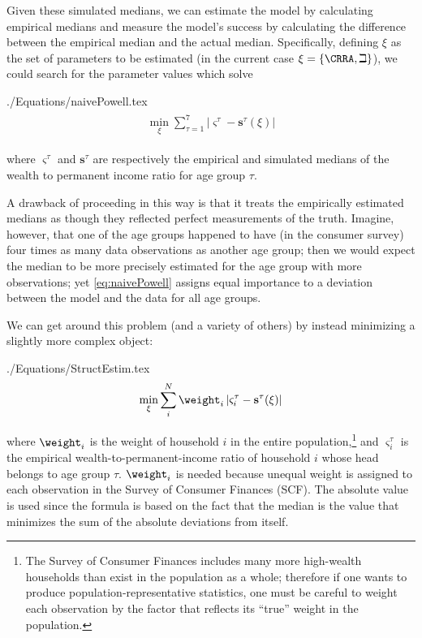 \documentclass[titlepage]{\econtex}
\begin{document}
  Given these simulated medians, we can estimate the model by
  calculating empirical medians and measure the model's success
  by calculating the difference between the empirical median and the
  actual median.  Specifically, defining $\xi$ as the set of parameters
  to be estimated (in the current case $\xi =\{\CRRA ,{\beth}\}$), we could search for
  the parameter values which solve
  \begin{verbatimwrite}{./Equations/naivePowell.tex}
    \begin{equation}\begin{gathered}\begin{aligned}
      \min_{\xi} \sum_{\tau=1}^{7} |\varsigma^{\tau} -\mathbf{s}^{\tau}(\xi)|  \label{eq:naivePowell}
    \end{aligned}\end{gathered}\end{equation}
  \end{verbatimwrite}
  
  where $\varsigma^{\tau }$ and $\mathbf{s}^{\tau}$ are respectively the empirical and simulated medians of the wealth to permanent income ratio for age group $\tau $.

  A drawback of proceeding in this way is that it treats the empirically
  estimated medians as though they reflected perfect measurements of the
  truth. Imagine, however, that one of the age groups happened to have
  (in the consumer survey) four times as many data observations as
  another age group; then we would expect the median to be more
  precisely estimated for the age group with more observations; yet
  \eqref{eq:naivePowell} assigns equal importance to a deviation between
  the model and the data for all age groups.

  We can get around this problem (and a variety of others) by instead minimizing a slightly more complex object:
  \begin{verbatimwrite}{./Equations/StructEstim.tex}
    \begin{equation}
      \min_{\xi}\sum\limits_{i}^{N}\weight _{i}\left|\varsigma_{i}^{\tau }-\mathbf{s}^{\tau}(\xi )\right|\label{eq:StructEstim}
    \end{equation}
  \end{verbatimwrite}
  
  where $\weight_{i}$ is the weight of household $i$ in the entire
  population,\footnote{The Survey of Consumer Finances includes many
    more high-wealth households than exist in the population as a whole;
    therefore if one wants to produce population-representative
    statistics, one must be careful to weight each observation by the
    factor that reflects its ``true'' weight in the population.} and
  $\varsigma_{i}^{\tau }$ is the empirical wealth-to-permanent-income
  ratio of household $i$ whose head belongs to age group
  $\tau$. $\weight _{i}$ is needed because unequal weight is assigned to
  each observation in the Survey of Consumer Finances (SCF). The
  absolute value is used since the formula is based on the fact that the
  median is the value that minimizes the sum of the absolute deviations
  from itself.
\end{document}

